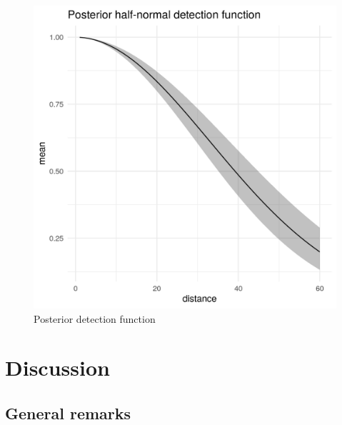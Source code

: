 \documentclass[preprint,12pt]{elsarticle}
\begin{document}
\begin{figure}
	\includegraphics[scale=0.6]{figures/halfnormal.png}
	\caption{Posterior detection function}
	\label{fig:half-normal}
\end{figure}

\bigskip

\newpage

\section*{Discussion}

\subsection*{General remarks}
\end{document}
